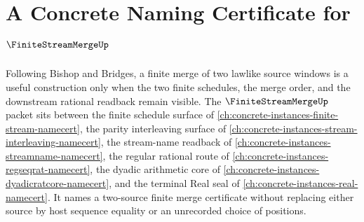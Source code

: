 \chapter{A Concrete Naming Certificate for $\FiniteStreamMergeUp$}
\label{ch:concrete-instances-finite-stream-merge-namecert}

Following Bishop and Bridges, a finite merge of two lawlike source windows is a useful construction only when the two finite schedules, the merge order, and the downstream rational readback remain visible. The $\FiniteStreamMergeUp$ packet sits between the finite schedule surface of \autoref{ch:concrete-instances-finite-stream-namecert}, the parity interleaving surface of \autoref{ch:concrete-instances-stream-interleaving-namecert}, the stream-name readback of \autoref{ch:concrete-instances-streamname-namecert}, the regular rational route of \autoref{ch:concrete-instances-regseqrat-namecert}, the dyadic arithmetic core of \autoref{ch:concrete-instances-dyadicratcore-namecert}, and the terminal Real seal of \autoref{ch:concrete-instances-real-namecert}. It names a two-source finite merge certificate without replacing either source by host sequence equality or an unrecorded choice of positions.

